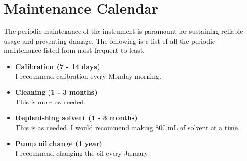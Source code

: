 \documentclass[12pt, letterpaper]{article}
\begin{document}
\section{Maintenance Calendar}
The periodic maintenance of the instrument is paramount for sustaining reliable usage and preventing damage.
The following is a list of all the periodic maintenance listed from most frequent to least.

\begin{itemize}

\item \textbf{Calibration (7 - 14 days)}\\
I recommend calibration every Monday morning.

\item \textbf{Cleaning (1 - 3 months)}\\
This is more as needed.

\item \textbf{Replenishing solvent (1 - 3 months)}\\
This is as needed. I would recommend making 800 mL of solvent at a time.

\item \textbf{Pump oil change (1 year)}\\
I recommend changing the oil every January.


\end{itemize}
\end{document}
